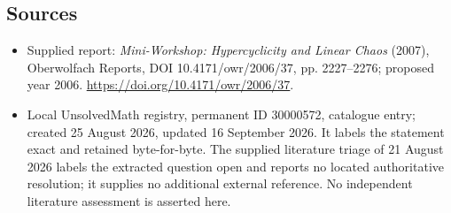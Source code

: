 \documentclass[11pt]{article}
\begin{document}
\subsection{Sources}
\begin{itemize}
\item Supplied report: \emph{Mini-Workshop: Hypercyclicity and Linear Chaos} (2007), Oberwolfach Reports, DOI 10.4171/owr/2006/37, pp. 2227--2276; proposed year 2006. \url{https://doi.org/10.4171/owr/2006/37}.
\item Local UnsolvedMath registry, permanent ID 30000572, catalogue entry; created 25 August 2026, updated 16 September 2026. It labels the statement exact and retained byte-for-byte. The supplied literature triage of 21 August 2026 labels the extracted question open and reports no located authoritative resolution; it supplies no additional external reference. No independent literature assessment is asserted here.
\end{itemize}
\end{document}

